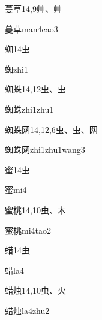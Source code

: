 \begin{entry}{蔓草}{14,9}{⾋、⾋}
  \begin{phonetics}{蔓草}{man4cao3}
  \end{phonetics}
\end{entry}

\begin{entry}{蜘}{14}{⾍}
  \begin{phonetics}{蜘}{zhi1}
  \end{phonetics}
\end{entry}

\begin{entry}{蜘蛛}{14,12}{⾍、⾍}
  \begin{phonetics}{蜘蛛}{zhi1zhu1}
  \end{phonetics}
\end{entry}

\begin{entry}{蜘蛛网}{14,12,6}{⾍、⾍、⽹}
  \begin{phonetics}{蜘蛛网}{zhi1zhu1wang3}
  \end{phonetics}
\end{entry}

\begin{entry}{蜜}{14}{⾍}
  \begin{phonetics}{蜜}{mi4}
  \end{phonetics}
\end{entry}

\begin{entry}{蜜桃}{14,10}{⾍、⽊}
  \begin{phonetics}{蜜桃}{mi4tao2}
  \end{phonetics}
\end{entry}

\begin{entry}{蜡}{14}{⾍}
  \begin{phonetics}{蜡}{la4}
  \end{phonetics}
\end{entry}

\begin{entry}{蜡烛}{14,10}{⾍、⽕}
  \begin{phonetics}{蜡烛}{la4zhu2}
  \end{phonetics}
\end{entry}

